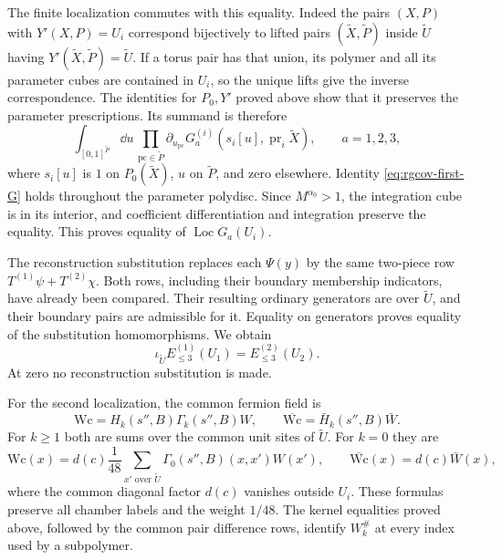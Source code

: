 The finite localization commutes with this equality.
Indeed the pairs $(X,P)$ with $Y'(X,P)=U_i$ correspond
bijectively to lifted pairs $(\widetilde X,\widetilde P)$
inside $\widetilde U$ having
$Y'(\widetilde X,\widetilde P)=\widetilde U$.
If a torus pair has that union, its polymer and all
its parameter cubes are contained in $U_i$, so the
unique lifts give the inverse correspondence.
The identities for $P_0,Y'$ proved above show that
it preserves the parameter prescriptions.
Its summand is therefore
\begin{equation}\label{eq:rgcov-localization-term}
 \int_{[0,1]^{\widetilde P}}\dd u\,
       \prod_{\mathrm{pc}\in\widetilde P}\partial_{u_{\mathrm{pc}}}
                       G_a^{(i)}(s_i[u],\operatorname{pr}_i\widetilde X),\qquad a=1,2,3,
\end{equation}
where $s_i[u]$ is $1$ on $P_0(\widetilde X)$, $u$ on
$\widetilde P$, and zero elsewhere.
Identity \eqref{eq:rgcov-first-G} holds throughout
the parameter polydisc. Since $M^{\alpha_0}>1$,
the integration cube is in its interior, and
coefficient differentiation and integration preserve
the equality. This proves equality of
$\operatorname{Loc}G_a(U_i)$.

The reconstruction substitution replaces each $\Psi(y)$
by the same two-piece row $T^{(1)}\psi+T^{(2)}\chi$.
Both rows, including their boundary membership indicators,
have already been compared. Their resulting ordinary
generators are over $\widetilde U$, and their boundary
pairs are admissible for it. Equality on generators
proves equality of the substitution homomorphisms.
We obtain
\begin{equation}\label{eq:rgcov-first-localization}
              \iota_{\widetilde U}E_{\le3}^{(1)}(U_1)
                                      =E_{\le3}^{(2)}(U_2).
\end{equation}
At zero no reconstruction substitution is made.

For the second localization, the common fermion field is
\[
 \mathrm{Wc}=H_k(s'',B)\Gamma_k(s'',B)W,\qquad
 \overline{\mathrm{Wc}}=\bar H_k(s'',B)\bar W .
\]
For $k\ge1$ both are sums over the common unit sites
of $\widetilde U$. For $k=0$ they are
\[
 \mathrm{Wc}(x)=d(c)\frac1{48}
            \sum_{x'\text{ over }\widetilde U}
                                      \Gamma_0(s'',B)(x,x')W(x'),
 \qquad
 \overline{\mathrm{Wc}}(x)=d(c)\bar W(x),
\]
where the common diagonal factor $d(c)$ vanishes
outside $U_i$. These formulas preserve all chamber
labels and the weight $1/48$.
The kernel equalities proved above, followed by the
common pair difference rows, identify $W_k^\#$ at
every index used by a subpolymer.

